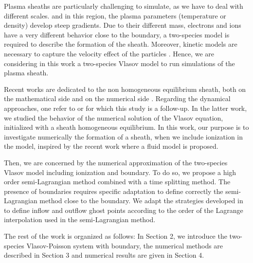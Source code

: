 \documentclass{article}
\numberwithin{equation}{section}
\begin{document}
Plasma sheaths are particularly challenging to simulate, as we have to deal with different scales. and in this region, 
the plasma parameters (temperature or density) develop steep gradients. Due to their different mass, 
electrons and ions have a very different behavior close to the boundary, a two-species model is required 
to describe the formation of the sheath. Moreover, kinetic  models are necessary to capture the velocity 
effect of the particles \cite{bourneNonUniformSplinesSemiLagrangian}.  Hence, we are considering in this work 
a two-species Vlasov model to run simulations of the plasma sheath. 

Recent works are dedicated to the non homogeneous equilibrium sheath, both on the mathematical side and on the numerical side \cite{badsiCollisionalSheathSolutions2021, badsiStableFixedPoint2021, despresMinimizationFormulationBikinetic2016}. 
Regarding the dynamical approaches, one refer to \cite{manfredi2014, bourneNonUniformSplinesSemiLagrangian} 
or \cite{badsiNumericalStabilityPlasma} for which this study is a follow-up. 
In the latter work, we studied the behavior of the numerical solution of the Vlasov equation, initialized with a sheath
homogeneous equilibrium. In this work, our purpose is to investigate numerically the formation of a sheath, 
when we include ionization in the model, inspired by the recent work \cite{Alvarez_Laguna_2020} where a fluid model 
is proposed.   

Then, we are concerned by the numerical approximation of the two-species Vlasov model including ionization and boundary. 
To do so, we propose a high order semi-Lagrangian method combined with a time splitting method. 
The presence of boundaries requires specific adaptation to define correctly the semi-Lagrangian method close to the boundary. 
We adapt the strategies developed in \cite{coulombelNeumannNumericalBoundary2020, boutinHighOrderNumerical2021} 
to define inflow and outflow ghost points according to the order of the Lagrange interpolation used in the semi-Lagrangian method.  

The rest of the work is organized as follows: In Section 2, we introduce the two-species Vlasov-Poisson system with boundary,  
the numerical methods are described in Section 3 and numerical results are given in Section 4. 
\end{document}
